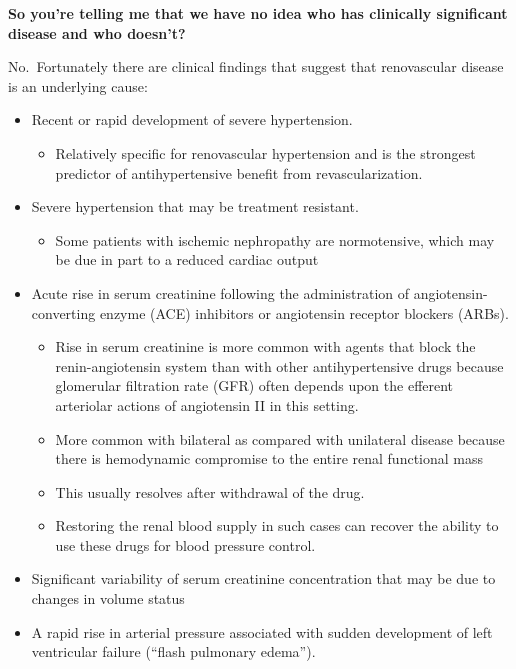 \documentclass[
]{book}
\providecommand{\tightlist}{%
  \setlength{\itemsep}{0pt}\setlength{\parskip}{0pt}}
\begin{document}
\textbf{So you're telling me that we have no idea who has clinically
significant disease and who doesn't?}

No.~Fortunately there are clinical findings that suggest that
renovascular disease is an underlying cause:

\begin{itemize}
\item
  Recent or rapid development of severe hypertension.

  \begin{itemize}
  \tightlist
  \item
    Relatively specific for renovascular hypertension and is the
    strongest predictor of antihypertensive benefit from
    revascularization.
  \end{itemize}
\item
  Severe hypertension that may be treatment resistant.

  \begin{itemize}
  \tightlist
  \item
    Some patients with ischemic nephropathy are normotensive, which
    may be due in part to a reduced cardiac output
  \end{itemize}
\item
  Acute rise in serum creatinine following the administration of
  angiotensin-converting enzyme (ACE) inhibitors or angiotensin
  receptor blockers (ARBs).

  \begin{itemize}
  \item
    Rise in serum creatinine is more common with agents that block
    the renin-angiotensin system than with other antihypertensive
    drugs because glomerular filtration rate (GFR) often depends
    upon the efferent arteriolar actions of angiotensin II in this
    setting.
  \item
    More common with bilateral as compared with unilateral disease
    because there is hemodynamic compromise to the entire renal
    functional mass
  \item
    This usually resolves after withdrawal of the drug.
  \item
    Restoring the renal blood supply in such cases can recover the
    ability to use these drugs for blood pressure control.
  \end{itemize}
\item
  Significant variability of serum creatinine concentration that may
  be due to changes in volume status
\item
  A rapid rise in arterial pressure associated with sudden development
  of left ventricular failure (``flash pulmonary edema'').


\end{itemize}
\end{document}
